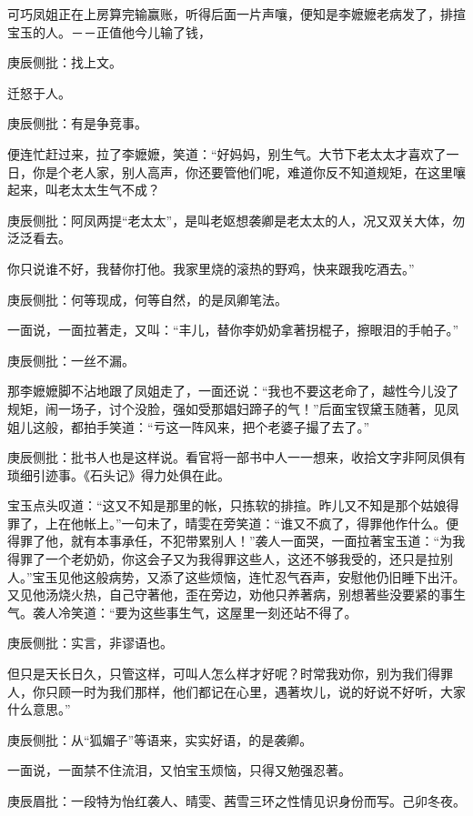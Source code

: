\begin{parag}
    可巧凤姐正在上房算完输赢账，听得后面一片声嚷，便知是李嬷嬷老病发了，排揎宝玉的人。－－正值他今儿输了钱，\begin{note}庚辰侧批：找上文。\end{note}迁怒于人。\begin{note}庚辰侧批：有是争竞事。\end{note}便连忙赶过来，拉了李嬷嬷，笑道：“好妈妈，别生气。大节下老太太才喜欢了一日，你是个老人家，别人高声，你还要管他们呢，难道你反不知道规矩，在这里嚷起来，叫老太太生气不成？\begin{note}庚辰侧批：阿凤两提“老太太”，是叫老妪想袭卿是老太太的人，况又双关大体，勿泛泛看去。\end{note}你只说谁不好，我替你打他。我家里烧的滚热的野鸡，快来跟我吃酒去。”\begin{note}庚辰侧批：何等现成，何等自然，的是凤卿笔法。\end{note}一面说，一面拉著走，又叫：“丰儿，替你李奶奶拿著拐棍子，擦眼泪的手帕子。”\begin{note}庚辰侧批：一丝不漏。\end{note}那李嬷嬷脚不沾地跟了凤姐走了，一面还说：“我也不要这老命了，越性今儿没了规矩，闹一场子，讨个没脸，强如受那娼妇蹄子的气！”后面宝钗黛玉随著，见凤姐儿这般，都拍手笑道：“亏这一阵风来，把个老婆子撮了去了。”\begin{note}庚辰侧批：批书人也是这样说。看官将一部书中人一一想来，收拾文字非阿凤俱有琐细引迹事。《石头记》得力处俱在此。\end{note}
\end{parag}


\begin{parag}
    宝玉点头叹道：“这又不知是那里的帐，只拣软的排揎。昨儿又不知是那个姑娘得罪了，上在他帐上。”一句未了，晴雯在旁笑道：“谁又不疯了，得罪他作什么。便得罪了他，就有本事承任，不犯带累别人！”袭人一面哭，一面拉著宝玉道：“为我得罪了一个老奶奶，你这会子又为我得罪这些人，这还不够我受的，还只是拉别人。”宝玉见他这般病势，又添了这些烦恼，连忙忍气吞声，安慰他仍旧睡下出汗。又见他汤烧火热，自己守著他，歪在旁边，劝他只养著病，别想著些没要紧的事生气。袭人冷笑道：“要为这些事生气，这屋里一刻还站不得了。\begin{note}庚辰侧批：实言，非谬语也。\end{note}但只是天长日久，只管这样，可叫人怎么样才好呢？时常我劝你，别为我们得罪人，你只顾一时为我们那样，他们都记在心里，遇著坎儿，说的好说不好听，大家什么意思。”\begin{note}庚辰侧批：从“狐媚子”等语来，实实好语，的是袭卿。\end{note}一面说，一面禁不住流泪，又怕宝玉烦恼，只得又勉强忍著。\begin{note}庚辰眉批：一段特为怡红袭人、晴雯、茜雪三环之性情见识身份而写。己卯冬夜。\end{note}
\end{parag}


